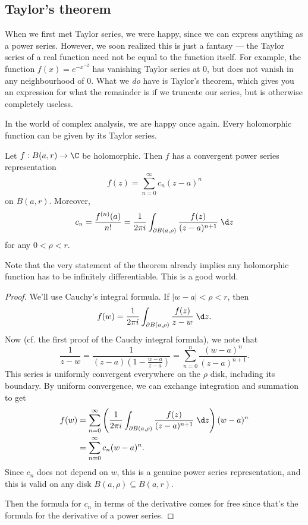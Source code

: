 \documentclass[a4paper]{article}
\begin{document}
\subsection{Taylor's theorem}
When we first met Taylor series, we were happy, since we can express anything as a power series. However, we soon realized this is just a fantasy --- the Taylor series of a real function need not be equal to the function itself. For example, the function $f(x) = e^{-x^{-2}}$ has vanishing Taylor series at $0$, but does not vanish in any neighbourhood of $0$. What we \emph{do} have is Taylor's theorem, which gives you an expression for what the remainder is if we truncate our series, but is otherwise completely useless.

In the world of complex analysis, we are happy once again. Every holomorphic function can be given by its Taylor series.
\begin{thm}
  Let $f: B(a, r) \to \C$ be holomorphic. Then $f$ has a convergent power series representation
  \[
    f(z) = \sum_{n = 0}^\infty c_n (z - a)^n
  \]
  on $B(a, r)$. Moreover,
  \[
    c_n = \frac{f^{(n)}(a)}{n!} = \frac{1}{2\pi i}\int_{\partial B(a, \rho)}\frac{f(z)}{(z - a)^{n + 1}}\;\d z
  \]
  for any $0 < \rho < r$.
\end{thm}
Note that the very statement of the theorem already implies any holomorphic function has to be infinitely differentiable. This is a good world.

\begin{proof}
  We'll use Cauchy's integral formula. If $|w - a|< \rho < r$, then
  \[
    f(w) = \frac{1}{2\pi i} \int_{\partial B(a, \rho)} \frac{f(z)}{z - w}\;\d z.
  \]
  Now (cf. the first proof of the Cauchy integral formula), we note that
  \[
    \frac{1}{z - w} = \dfrac{1}{(z - a)\left(1 - \frac{w - a}{z - a}\right)} = \sum_{n = 0}^n \frac{(w - a)^n}{(z - a)^{n + 1}}.
  \]
  This series is uniformly convergent everywhere on the $\rho$ disk, including its boundary. By uniform convergence, we can exchange integration and summation to get
  \begin{align*}
    f(w) &= \sum_{n = 0}^\infty \left(\frac{1}{2\pi i} \int_{\partial B(a, \rho)} \frac{f(z)}{(z - a)^{n + 1}}\;\d z\right) (w - a)^n\\
    &= \sum_{n = 0}^\infty c_n (w - a)^n.
  \end{align*}
  Since $c_n$ does not depend on $w$, this is a genuine power series representation, and this is valid on any disk $B(a, \rho) \subseteq B(a, r)$.

  Then the formula for $c_n$ in terms of the derivative comes for free since that's the formula for the derivative of a power series.
\end{proof}
\end{document}
